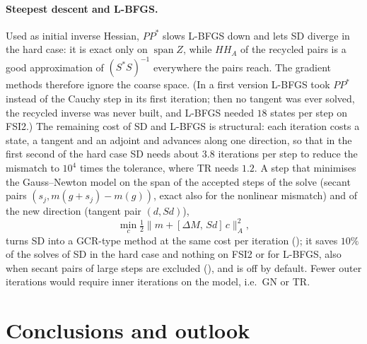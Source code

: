 \documentclass[11pt,a4paper]{article}
\theoremstyle{definition}
\theoremstyle{remark}
\begin{document}
\paragraph{Steepest descent and L-BFGS.} Used as initial inverse Hessian, $PP^*$ slows L-BFGS down
and lets SD diverge in the hard case: it is exact only on $\operatorname{span}Z$, while $HH_A$ of
the recycled pairs is a good approximation of $(S^*S)^{-1}$ everywhere the pairs reach. The gradient
methods therefore ignore the coarse space. (In a first version L-BFGS took $PP^*$ instead of the
Cauchy step in its first iteration; then no tangent was ever solved, the recycled inverse was never
built, and L-BFGS needed $18$ states per step on FSI2.) The remaining cost of SD and L-BFGS is
structural: each iteration costs a state, a tangent and an adjoint and advances along one
direction, so that in the first second of the hard case SD needs about $3.8$ iterations per step
to reduce the mismatch to $10^4$ times the tolerance, where TR needs $1.2$. A step that minimises the Gauss--Newton model on the
span of the accepted steps of the solve (secant pairs $(s_j,m(g+s_j)-m(g))$, exact also for the
nonlinear mismatch) and of the new direction (tangent pair $(d,Sd)$),
\[
  \min_c\tfrac12\big\|m+[\Delta M,\,Sd]\,c\big\|_A^2,
\]
turns SD into a GCR-type method at the same cost per iteration
(); it saves $10\%$ of the solves of SD in the hard case and
nothing on FSI2 or for L-BFGS, also when secant pairs of large steps are excluded
(), and is off by default. Fewer outer iterations would require inner
iterations on the model, i.e.\ GN or TR.

\section{Conclusions and outlook}\label{sec:conclusions}
\end{document}
